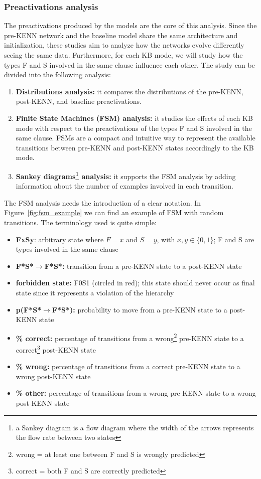 \subsubsection{Preactivations analysis} \label{preactivation_analysis}
The preactivations produced by the models are the core of this analysis. Since the pre-KENN network and the baseline model share the same architecture and initialization, these studies aim to analyze how the networks evolve differently seeing the same data. Furthermore, for each KB mode, we will study how the types F and S involved in the same clause influence each other. The study can be divided into the following analysis:
\begin{enumerate}
    \item \textbf{Distributions analysis:} it compares the distributions of the pre-KENN, post-KENN, and baseline preactivations.
    \item \textbf{Finite State Machines (FSM) analysis:} it studies the effects of each KB mode with respect to the preactivations of the types F and S involved in the same clause. FSMs are a compact and intuitive way to represent the available transitions between pre-KENN and post-KENN states accordingly to the KB mode.
    \item \textbf{Sankey diagrams\footnote{a Sankey diagram is a flow diagram where the width of the arrows represents the flow rate between two states} analysis:} it supports the FSM analysis by adding information about the number of examples involved in each transition. 
\end{enumerate}
The FSM analysis needs the introduction of a clear notation. In Figure~\ref{fig:fsm_example} we can find an example of FSM with random transitions. The terminology used is quite simple:
\begin{itemize}
    \item \textbf{FxSy}: arbitrary state where $ F = x $ and $ S = y $, with $x,y \in \{0, 1\}$; F and S are types involved in the same clause
    \item \textbf{F*S*$\to$F*S*:} transition from a pre-KENN state to a post-KENN state
    \item \textbf{forbidden state:} F0S1 (circled in red); this state should never occur as final state since it represents a violation of the hierarchy
    \item \textbf{p(F*S*$\to$F*S*):} probability to move from a pre-KENN state to a post-KENN state
    \item \textbf{\% correct:} percentage of transitions from a wrong\footnote{wrong = at least one between F and S is wrongly predicted} pre-KENN state to a correct\footnote{correct = both F and S are correctly predicted} post-KENN state
    \item \textbf{\% wrong:} percentage of transitions from a correct pre-KENN state to a wrong post-KENN state
    \item \textbf{\% other:} percentage of transitions from a wrong pre-KENN state to a wrong post-KENN state
\end{itemize}
